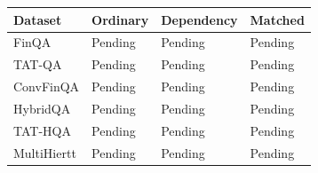 \begin{tabular}{llll}
Dataset & Ordinary & Dependency & Matched\\\hline
FinQA & Pending & Pending & Pending\\
TAT-QA & Pending & Pending & Pending\\
ConvFinQA & Pending & Pending & Pending\\
HybridQA & Pending & Pending & Pending\\
TAT-HQA & Pending & Pending & Pending\\
MultiHiertt & Pending & Pending & Pending\\
\end{tabular}
